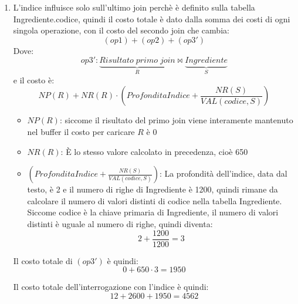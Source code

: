 \documentclass[a4paper,twoside]{article}
\begin{document}
\begin{exercise}
\begin{enumerate}
    \item L'indice influisce solo sull'ultimo join perchè è definito sulla tabella
      Ingrediente.codice, quindi il costo totale è dato dalla somma dei costi
      di ogni singola operazione, con il costo del secondo join che cambia:
      \[
        (op1) + (op2) + (op3')
      \] 
      Dove:
      \[
        op3': \underbrace{Risultato\;primo\;join}_R \bowtie
            \underbrace{Ingrediente}_{S}
      \] 
      e il costo è:
      \[
        NP(R) + NR(R) \cdot \left( ProfonditaIndice + \frac{NR(S)}{VAL(codice, S)} \right)
      \] 
      \begin{itemize}
        \item \( NP(R) \): siccome il risultato del primo join viene
          interamente mantenuto nel buffer il costo per caricare \( R \) 
          è 0

        \item \( NR(R) \): È lo stesso valore calcolato in precedenza, cioè 650

        \item \( \left( ProfonditaIndice + \frac{NR(S)}{VAL(codice, S)} \right) \):
          La profondità dell'indice, data dal testo, è 2 e il numero di righe
          di Ingrediente è 1200, quindi rimane da calcolare il numero di valori distinti
          di codice nella tabella Ingrediente. Siccome codice è la chiave primaria
          di Ingrediente, il numero di valori distinti è uguale al numero di righe,
          quindi diventa:
          \[
            2 + \frac{1200}{1200} = 3
          \] 
      \end{itemize}
      Il costo totale di \( (op3') \) è quindi:
      \[
        0 + 650 \cdot 3 = 1950
      \] 

      \vspace{1em}
      \noindent
      Il costo totale dell'interrogazione con l'indice è quindi:
      \[
        12 + 2600 + 1950 = 4562
      \] 
  \end{enumerate}
\end{exercise}
\end{document}
